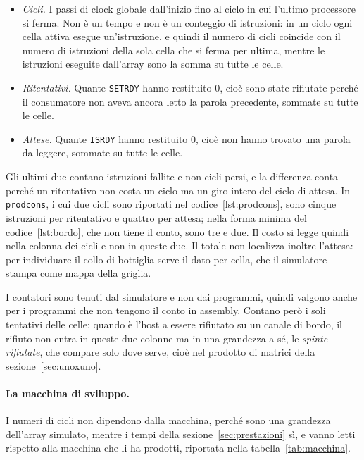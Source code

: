 \begin{itemize}
    \item \emph{Cicli.} I passi di clock globale dall'inizio fino al ciclo in cui 
          l'ultimo processore si ferma.
          Non è un tempo e non è un conteggio di istruzioni: in un ciclo
          ogni cella attiva esegue un'istruzione, e quindi il numero di cicli
          coincide con il numero di istruzioni della sola cella che si ferma per
          ultima, mentre le istruzioni eseguite dall'array sono la somma su tutte
          le celle.
    \item \emph{Ritentativi.} Quante \texttt{SETRDY} hanno restituito 0, cioè sono state rifiutate perché il consumatore non aveva ancora letto la
          parola precedente, sommate su tutte le
          celle.
    \item \emph{Attese.} Quante \texttt{ISRDY} hanno restituito 0, cioè non hanno trovato una parola da leggere, sommate su tutte le celle.
\end{itemize}

Gli ultimi due contano istruzioni fallite e non cicli persi, e la differenza
conta perché un ritentativo non costa un ciclo ma un giro intero del ciclo di
attesa. In \texttt{prodcons}, i cui due cicli sono riportati nel
codice~\ref{lst:prodcons}, sono cinque istruzioni per ritentativo e quattro
per attesa; nella forma minima del codice~\ref{lst:bordo}, che non tiene il
conto, sono tre e due. Il costo si legge quindi nella colonna dei cicli e non in queste due. Il totale non localizza inoltre l'attesa: per
individuare il collo di bottiglia serve il dato per cella, che il simulatore
stampa come mappa della griglia.

I contatori sono tenuti dal simulatore e non dai programmi, quindi valgono anche
per i programmi che non tengono il conto in assembly. Contano però i soli
tentativi delle celle: quando è l'host a essere rifiutato su un canale di
bordo, il rifiuto non entra in queste due colonne ma in una grandezza a sé, le
\emph{spinte rifiutate}, che compare solo dove serve, cioè nel prodotto di
matrici della sezione~\ref{sec:unoxuno}.

\paragraph*{La macchina di sviluppo.} I numeri di cicli non dipendono dalla macchina, perché sono una grandezza
dell'array simulato, mentre i tempi della sezione~\ref{sec:prestazioni} sì, e vanno
letti rispetto alla macchina che li ha prodotti, riportata nella
tabella~\ref{tab:macchina}.

